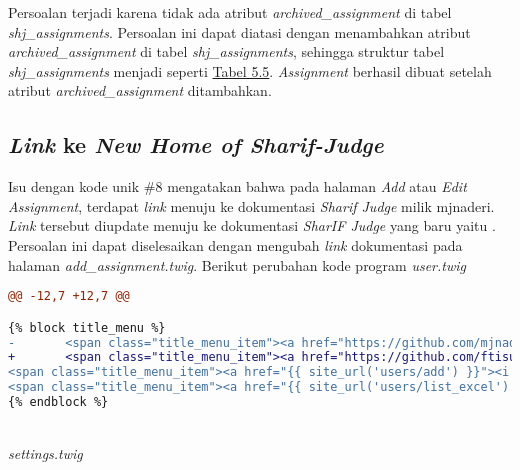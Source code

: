 	Persoalan terjadi karena tidak ada atribut \textit{archived\_assignment} di tabel \textit{shj\_assignments}. Persoalan ini dapat diatasi dengan menambahkan atribut \textit{archived\_assignment} di tabel \textit{shj\_assignments}, sehingga struktur tabel \textit{shj\_assignments} menjadi seperti \hyperref[tab:atributtabelassignments]{Tabel 5.5}. \textit{Assignment} berhasil dibuat setelah atribut \textit{archived\_assignment} ditambahkan.
	
	\subsection{\textit{Link} ke \textit{New Home of Sharif-Judge}}
	Isu dengan kode unik \#8 mengatakan bahwa pada halaman \textit{Add} atau \textit{Edit Assignment}, terdapat \textit{link} menuju ke dokumentasi \textit{Sharif Judge} milik mjnaderi. \textit{Link} tersebut diupdate menuju ke dokumentasi \textit{SharIF Judge} yang baru yaitu . Persoalan ini dapat diselesaikan dengan mengubah \textit{link} dokumentasi pada halaman \textit{add\_assignment.twig}. Berikut perubahan kode program
	\textit{user.twig}
\begin{lstlisting}[language=diff, basicstyle=\ttfamily, frame=single,
columns=fullflexible, keepspaces=true, breaklines=true]
@@ -12,7 +12,7 @@

{% block title_menu %}
-       <span class="title_menu_item"><a href="https://github.com/mjnaderi/Sharif-Judge/blob/docs/v1.4/users.md" target="_blank"><i class="fa fa-question-circle color6"></i> Help</a></span>
+       <span class="title_menu_item"><a href="https://github.com/ftisunpar/Sharif-Judge/blob/docs/v1.4/users.md" target="_blank"><i class="fa fa-question-circle color6"></i> Help</a></span>
<span class="title_menu_item"><a href="{{ site_url('users/add') }}"><i class="fa fa-plus color11"></i> Add Users</a></span>
<span class="title_menu_item"><a href="{{ site_url('users/list_excel') }}"><i class="fa fa-download color9"></i> Excel</a></span>
{% endblock %}
\end{lstlisting}
~\\	
	\textit{settings.twig}
